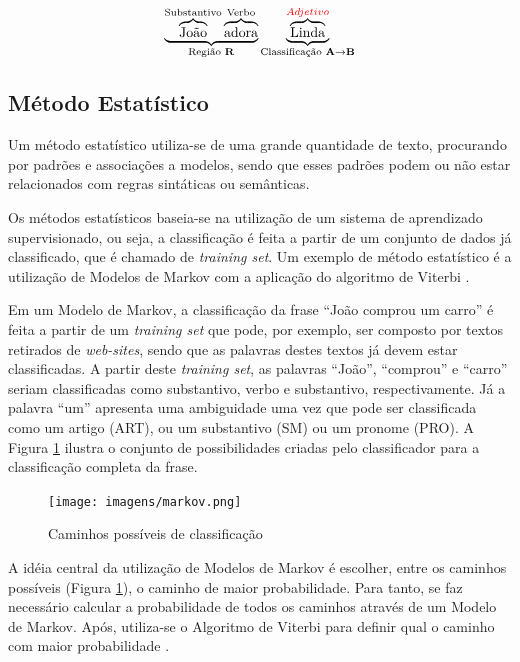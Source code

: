 \begin{itemize}
  \[\underbrace{\overbrace{\text{João}}^\text{Substantivo}
  \overbrace{\text{adora}}^\text{Verbo}}_\text{Região \textbf{R}}
  \underbrace{\overbrace{\text{L}\text{inda}}^{\textcolor{red}{Adjetivo}}}_\text{Classificação
  \textbf{A}\textrightarrow\textbf{B}}
  \]
  
  
\end{itemize}

\subsection{Método Estatístico}
Um método estatístico utiliza-se de uma grande
quantidade de texto, procurando por padrões e
associações a modelos, sendo que esses padrões podem ou não estar relacionados
com regras sintáticas ou semânticas.

Os métodos estatísticos baseia-se na utilização de um sistema de aprendizado
supervisionado, ou seja, a classificação é feita a partir de um conjunto de dados já
classificado, que é chamado de \textit{training set}. Um exemplo de método
estatístico é a utilização de Modelos de Markov com a aplicação do algoritmo de
Viterbi \cite{manningschutze1999}.

Em um Modelo de Markov, a classificação da frase ``João comprou um
carro'' é feita a partir de um \textit{training set} que pode, por exemplo, ser
composto por textos retirados de \textit{web-sites}, sendo que as palavras
destes textos já devem estar classificadas. A partir deste \textit{training
set}, as palavras ``João'', ``comprou'' e ``carro'' seriam classificadas como
substantivo, verbo e substantivo, respectivamente. Já a palavra ``um'' apresenta uma ambiguidade uma vez que pode
ser classificada como um artigo (ART), ou um substantivo (SM) ou um pronome
(PRO).
A Figura \ref{fig:markov} ilustra o conjunto de possibilidades criadas pelo
classificador para a classificação completa da frase.

\begin{figure}[htbp]
\centering
\texttt{[image: imagens/markov.png]}
\caption{Caminhos possíveis de classificação}
\label{fig:markov}
\end{figure}

A idéia central da utilização de Modelos de Markov é
escolher, entre os caminhos possíveis (Figura \ref{fig:markov}), o caminho
de maior probabilidade. Para tanto, se faz necessário calcular a probabilidade de todos
os caminhos através de um Modelo de Markov. Após, utiliza-se o
Algoritmo de Viterbi para definir qual o caminho com maior probabilidade
\cite{manningschutze1999}.

